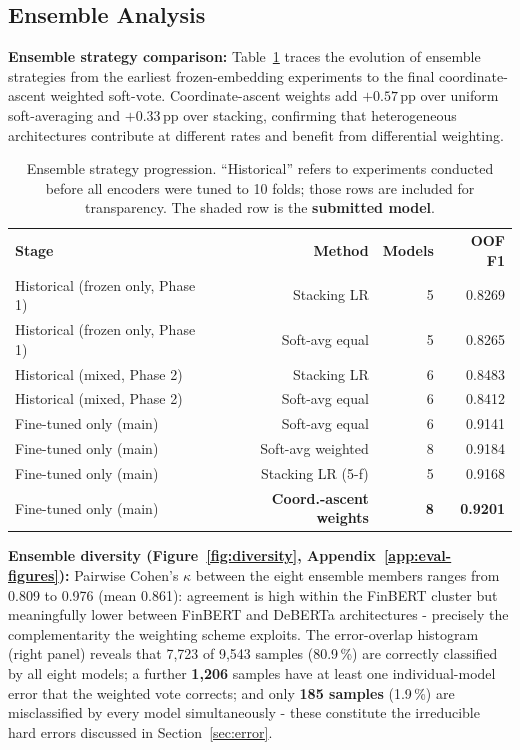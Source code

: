 \documentclass[11pt,a4paper]{article}
\newcommand{\tH}[1]{\textcolor{maincolor}{\textbf{#1}}}
\newcommand{\gmid}{\arrayrulecolor{maincolor}\midrule\arrayrulecolor{black}}
\begin{document}
\subsection{Ensemble Analysis}

\textbf{Ensemble strategy comparison:} Table~\ref{tab:ensemble} traces the evolution
of ensemble strategies from the earliest frozen-embedding experiments to the final
coordinate-ascent weighted soft-vote. Coordinate-ascent weights add $+0.57$\,pp over
uniform soft-averaging and $+0.33$\,pp over stacking, confirming that heterogeneous
architectures contribute at different rates and benefit from differential weighting.

\begin{table}[H]
  \centering\footnotesize\setlength{\tabcolsep}{4pt}
  \begin{tabularx}{\linewidth}{@{}>{\raggedright\arraybackslash}X r r r@{}}
    \toprule
    \tH{Stage} & \tH{Method} & \tH{Models} & \tH{OOF F1} \\
    \gmid
    Historical (frozen only, Phase 1)  & Stacking LR       & 5 & 0.8269 \\
    Historical (frozen only, Phase 1)  & Soft-avg equal    & 5 & 0.8265 \\
    Historical (mixed, Phase 2)        & Stacking LR       & 6 & 0.8483 \\
    Historical (mixed, Phase 2)        & Soft-avg equal    & 6 & 0.8412 \\
    Fine-tuned only (main)             & Soft-avg equal    & 6 & 0.9141 \\
    Fine-tuned only (main)             & Soft-avg weighted & 8 & 0.9184 \\
    Fine-tuned only (main)             & Stacking LR (5-f) & 5 & 0.9168 \\
    \rowcolor{lightgray}Fine-tuned only (main) & \textbf{Coord.-ascent weights} & \textbf{8} & \textbf{0.9201} \\
    \bottomrule
  \end{tabularx}
  \caption{Ensemble strategy progression. ``Historical'' refers to experiments conducted
  before all encoders were tuned to 10 folds; those rows are included for transparency.
  The shaded row is the \textbf{submitted model}.}
  \label{tab:ensemble}
\end{table}

\textbf{Ensemble diversity (Figure~\ref{fig:diversity}, Appendix~\ref{app:eval-figures}):} Pairwise Cohen's $\kappa$ between
the eight ensemble members ranges from 0.809 to 0.976 (mean 0.861): agreement is high
within the FinBERT cluster but meaningfully lower between FinBERT and DeBERTa architectures
- precisely the complementarity the weighting scheme exploits. The error-overlap histogram
(right panel) reveals that 7{,}723 of 9{,}543 samples (80.9\,\%) are correctly classified by
all eight models; a further \textbf{1{,}206} samples have at least one individual-model
error that the weighted vote corrects; and only \textbf{185 samples} (1.9\,\%) are
misclassified by every model simultaneously - these constitute the irreducible hard
errors discussed in Section~\ref{sec:error}.
\end{document}

